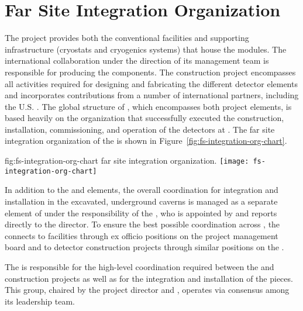 \section{Far Site Integration Organization}
\label{sec:exec-tc-partners}

The  project provides both the 
conventional facilities and supporting infrastructure (cryostats 
and cryogenics systems) that house the   
modules.  
The international  
collaboration under the direction of its management team is 
responsible for producing the  components.  The 
  construction project encompasses all 
activities required for designing and fabricating the different 
detector elements and incorporates contributions from a number 
of international partners, including the U.S. .  
The global structure of , which encompasses 
both project elements, is based heavily on 
the organization that successfully executed the construction,
installation, commissioning, and operation of the 
detectors at . 
The 
far site integration organization of the  is shown in Figure~\ref{fig:fs-integration-org-chart}. 

\begin{dunefigure}{fig:fs-integration-org-chart}
  { far site integration organization.}
  \texttt{[image: fs-integration-org-chart]} %
\end{dunefigure}

In addition to the  and  elements, the 
overall coordination for integration and installation  
in the excavated, underground caverns is managed as a separate
element of  under the responsibility of 
the , who is appointed by and reports directly to the 
 director.  To ensure the best possible coordination 
across , the  connects 
to facilities through 
ex officio positions on the  project management board 
and to detector construction projects through similar positions on the  .

The  is responsible for the high-level
coordination required between the  and  construction 
projects as well as for the integration and 
installation of the  pieces. This group, chaired by the  project director and ,  operates via  
consensus among its leadership team. 

